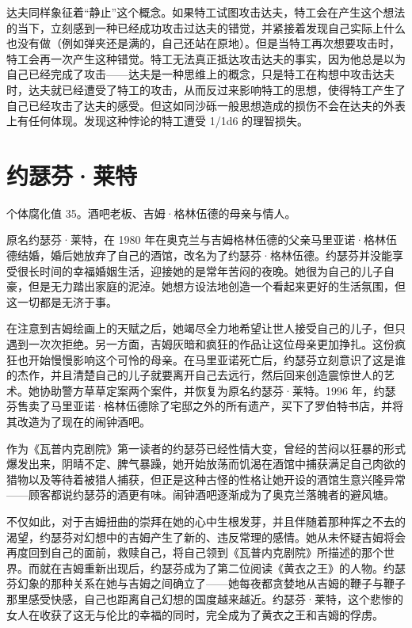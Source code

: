 达夫同样象征着“静止”这个概念。如果特工试图攻击达夫，特工会在产生这个想法的当下，立刻感到一种已经成功攻击过达夫的错觉，并紧接着发现自己实际上什么也没有做（例如弹夹还是满的，自己还站在原地）。但是当特工再次想要攻击时，特工会再一次产生这种错觉。特工无法真正抵达攻击达夫的事实，因为他总是以为自己已经完成了攻击——达夫是一种思维上的概念，只是特工在构想中攻击达夫时，达夫就已经遭受了特工的攻击，从而反过来影响特工的思想，使得特工产生了自己已经攻击了达夫的感受。但这如同沙砾一般思想造成的损伤不会在达夫的外表上有任何体现。发现这种悖论的特工遭受 1/1d6 的理智损失。

\section{约瑟芬·莱特}

个体腐化值 35。酒吧老板、吉姆·格林伍德的母亲与情人。

原名约瑟芬·莱特，在 1980 年在奥克兰与吉姆格林伍德的父亲马里亚诺·格林伍德结婚，婚后她放弃了自己的酒馆，改名为了约瑟芬·格林伍德。约瑟芬并没能享受很长时间的幸福婚姻生活，迎接她的是常年苦闷的夜晚。她很为自己的儿子自豪，但是无力踏出家庭的泥淖。她想方设法地创造一个看起来更好的生活氛围，但这一切都是无济于事。

在注意到吉姆绘画上的天赋之后，她竭尽全力地希望让世人接受自己的儿子，但只遇到一次次拒绝。另一方面，吉姆灰暗和疯狂的作品让这位母亲更加挣扎。这份疯狂也开始慢慢影响这个可怜的母亲。在马里亚诺死亡后，约瑟芬立刻意识了这是谁的杰作，并且清楚自己的儿子就要离开自己去远行，然后回来创造震惊世人的艺术。她协助警方草草定案两个案件，并恢复为原名约瑟芬·莱特。1996 年，约瑟芬售卖了马里亚诺·格林伍德除了宅邸之外的所有遗产，买下了罗伯特书店，并将其改造为了现在的闹钟酒吧。

作为《瓦普内克剧院》第一读者的约瑟芬已经性情大变，曾经的苦闷以狂暴的形式爆发出来，阴晴不定、脾气暴躁，她开始放荡而饥渴在酒馆中捕获满足自己肉欲的猎物以及等待着被猎人捕获，但正是这种古怪的性格让她开设的酒馆生意兴隆异常——顾客都说约瑟芬的酒更有味。闹钟酒吧逐渐成为了奥克兰落魄者的避风塘。

不仅如此，对于吉姆扭曲的崇拜在她的心中生根发芽，并且伴随着那种挥之不去的渴望，约瑟芬对幻想中的吉姆产生了新的、违反常理的感情。她从未怀疑吉姆将会再度回到自己的面前，救赎自己，将自己领到《瓦普内克剧院》所描述的那个世界。而就在吉姆重新出现后，约瑟芬成为了第二位阅读《黄衣之王》的人物。约瑟芬幻象的那种关系在她与吉姆之间确立了——她每夜都贪婪地从吉姆的鞭子与鞭子那里感受快感，自己也距离自己幻想的国度越来越近。约瑟芬·莱特，这个悲惨的女人在收获了这无与伦比的幸福的同时，完全成为了黄衣之王和吉姆的俘虏。

